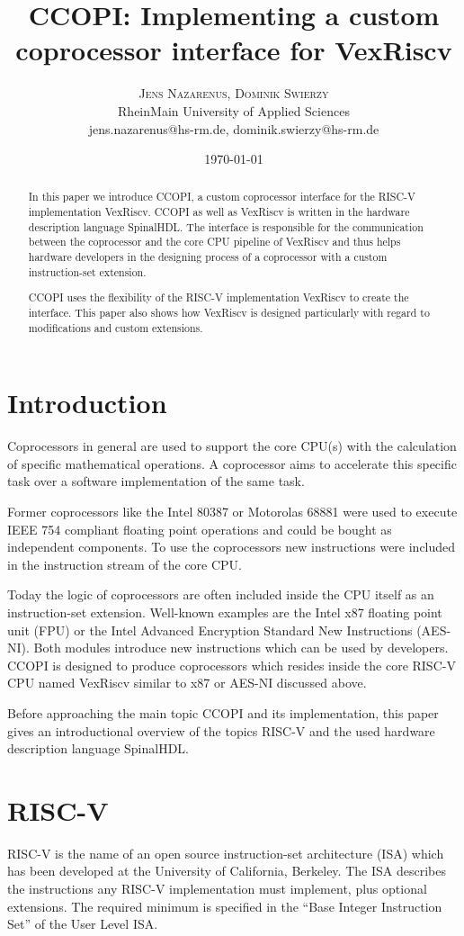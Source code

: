 \documentclass[twoside,twocolumn]{article}
\title{\vspace{-7mm}%
	\fontsize{24pt}{10pt}\selectfont
	\textbf{CCOPI: Implementing a custom coprocessor interface for
    VexRiscv}
	}
\author{%
	\large
	\textsc{Jens Nazarenus, Dominik Swierzy} \\[2mm]
	\normalsize	RheinMain University of Applied Sciences \\
    \normalsize	jens.nazarenus@hs-rm.de, dominik.swierzy@hs-rm.de
	}
\date{\today}
\begin{document}
\maketitle

\begin{abstract}
\noindent In this paper we introduce CCOPI, a custom coprocessor interface for the
RISC-V implementation VexRiscv. CCOPI as well as VexRiscv is written in
the hardware description language SpinalHDL. The interface is responsible 
for the communication between the coprocessor and the core CPU pipeline of 
VexRiscv and thus helps hardware developers in the designing process of 
a coprocessor with a custom instruction-set extension.

CCOPI uses the flexibility of the RISC-V implementation VexRiscv to create 
the interface. This paper also shows how VexRiscv is designed particularly with 
regard to modifications and custom extensions. 
\end{abstract}

\section{Introduction}
Coprocessors in general are used to support the core CPU(s) with the
calculation of specific mathematical operations. A coprocessor aims to
accelerate this specific task over a software implementation of the same
task.

Former coprocessors like the Intel 80387 or Motorolas 68881 were used to
execute IEEE 754 compliant floating point operations and could be
bought as independent components. To use the coprocessors new
instructions were included in the instruction stream of the core CPU.

Today the logic of coprocessors are often included inside the CPU
itself as an instruction-set extension. Well-known examples are the
Intel\textregistered{} x87 
floating point unit (FPU) or the Intel\textregistered{} Advanced Encryption Standard New 
Instructions (AES-NI). Both modules introduce new instructions which can
be used by developers.
CCOPI is designed to produce coprocessors which resides inside the core
RISC-V CPU named VexRiscv similar to x87 or AES-NI discussed above.

Before approaching the main topic CCOPI and its implementation, this paper
gives an introductional overview of the topics RISC-V and the used
hardware description language SpinalHDL.
\section{RISC-V}
RISC-V is the name of an open source instruction-set architecture (ISA)
which has been developed at the University of California, Berkeley.
The ISA describes the instructions any RISC-V implementation must
implement, plus optional extensions. The required minimum is specified in
the ``Base Integer Instruction Set'' of the User Level ISA.
\end{document}
